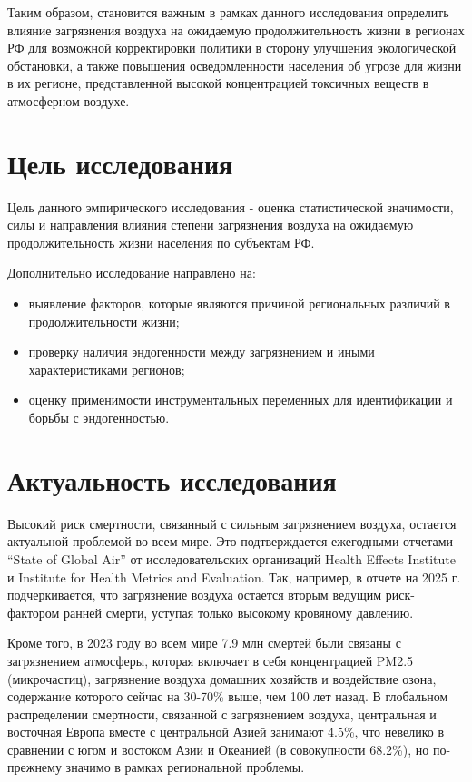 \documentclass[11pt,a4paper]{article}
\begin{document}
Таким образом, становится важным в рамках данного исследования определить влияние загрязнения воздуха на ожидаемую продолжительность жизни в регионах РФ для возможной корректировки политики в сторону улучшения экологической обстановки, а также повышения осведомленности населения об угрозе для жизни в их регионе, представленной высокой концентрацией токсичных веществ в атмосферном воздухе.

\section*{Цель исследования}
Цель данного эмпирического исследования - оценка статистической значимости, силы и направления влияния степени загрязнения воздуха на ожидаемую продолжительность жизни населения по субъектам РФ.

Дополнительно исследование направлено на:

\begin{itemize}
\item выявление факторов, которые являются причиной региональных различий в продолжительности жизни;
\item проверку наличия эндогенности между загрязнением и иными характеристиками регионов;
\item оценку применимости инструментальных переменных для идентификации и борьбы с эндогенностью.
\end{itemize}
\section*{Актуальность исследования}
Высокий риск смертности, связанный с сильным загрязнением воздуха, остается актуальной проблемой во всем мире. Это подтверждается ежегодными отчетами “State of Global Air” от исследовательских организаций Health Effects Institute и Institute for Health Metrics and Evaluation. Так, например, в отчете на 2025 г. подчеркивается, что загрязнение воздуха остается вторым ведущим риск-фактором ранней смерти, уступая только высокому кровяному давлению.

Кроме того, в 2023 году во всем мире 7.9 млн смертей были связаны с загрязнением атмосферы, которая включает в себя концентрацией PM2.5 (микрочастиц), загрязнение воздуха домашних хозяйств и воздействие озона, содержание которого сейчас на 30-70\% выше, чем 100 лет назад. В глобальном распределении смертности, связанной с загрязнением воздуха, центральная и восточная Европа вместе с центральной Азией занимают 4.5\%, что невелико в сравнении с югом и востоком Азии и Океанией (в совокупности 68.2\%), но по-прежнему значимо в рамках региональной проблемы.
\end{document}
